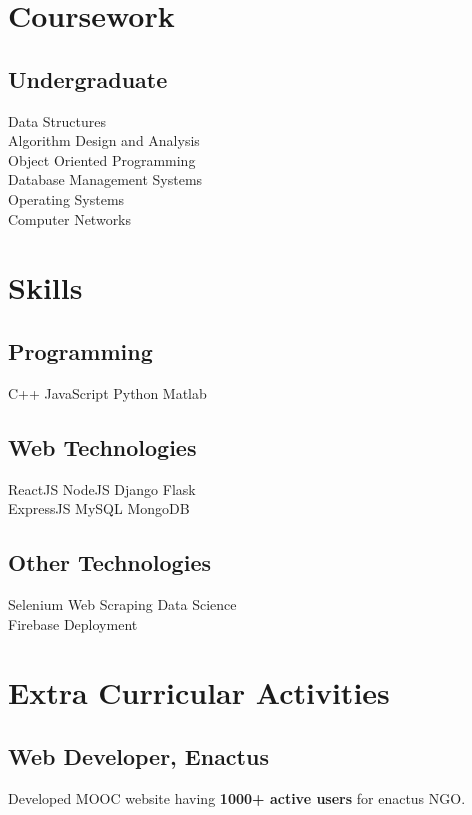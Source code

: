 \documentclass[]{ishaan-kamra-resume}
\begin{document}
\begin{minipage}[t]{0.33\textwidth}
\section{Coursework}
\subsection{Undergraduate}
Data Structures \\
Algorithm Design and Analysis \\
Object Oriented Programming \\
Database Management Systems \\
Operating Systems \\
Computer Networks \\


\section{Skills}
\subsection{Programming}
C++ \textbullet{} JavaScript \textbullet{} Python \textbullet{} Matlab 
\subsection{Web Technologies}
ReactJS \textbullet{} NodeJS \textbullet{} Django \textbullet{} Flask \\
ExpressJS \textbullet{} MySQL \textbullet{} MongoDB 
\subsection{Other Technologies}
Selenium \textbullet{} Web Scraping \textbullet{} Data Science \\
Firebase \textbullet{} Deployment
\sectionsep


\section{Extra Curricular Activities}
\subsection{Web Developer, Enactus}
\textbullet{} Developed MOOC website having \textbf{1000+ active users} for enactus NGO.

\end{minipage}
\end{document}
